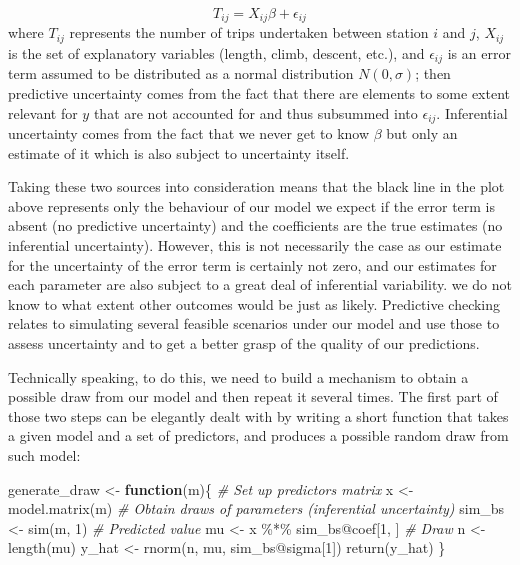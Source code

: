 \documentclass[
]{book}
\newenvironment{Shaded}{\begin{snugshade}}{\end{snugshade}}
\newcommand{\CommentTok}[1]{\textcolor[rgb]{0.56,0.35,0.01}{\textit{#1}}}
\newcommand{\ControlFlowTok}[1]{\textcolor[rgb]{0.13,0.29,0.53}{\textbf{#1}}}
\newcommand{\DecValTok}[1]{\textcolor[rgb]{0.00,0.00,0.81}{#1}}
\newcommand{\FunctionTok}[1]{\textcolor[rgb]{0.00,0.00,0.00}{#1}}
\newcommand{\NormalTok}[1]{#1}
\newcommand{\OtherTok}[1]{\textcolor[rgb]{0.56,0.35,0.01}{#1}}
\newcommand{\SpecialCharTok}[1]{\textcolor[rgb]{0.00,0.00,0.00}{#1}}
\begin{document}
\[
T_{ij} = X_{ij}\beta + \epsilon_{ij}
\]
where \(T_{ij}\) represents the number of trips undertaken between station \(i\) and \(j\), \(X_{ij}\) is the set of explanatory variables (length, climb, descent, etc.), and \(\epsilon_{ij}\) is an error term assumed to be distributed as a normal distribution \(N(0, \sigma)\); then predictive uncertainty comes from the fact that there are elements to some extent relevant for \(y\) that are not accounted for and thus subsummed into \(\epsilon_{ij}\). Inferential uncertainty comes from the fact that we never get to know \(\beta\) but only an estimate of it which is also subject to uncertainty itself.

Taking these two sources into consideration means that the black line in the plot above represents only the behaviour of our model we expect if the error term is absent (no predictive uncertainty) and the coefficients are the true estimates (no inferential uncertainty). However, this is not necessarily the case as our estimate for the uncertainty of the error term is certainly not zero, and our estimates for each parameter are also subject to a great deal of inferential variability. we do not know to what extent other outcomes would be just as likely. Predictive checking relates to simulating several feasible scenarios under our model and use those to assess uncertainty and to get a better grasp of the quality of our predictions.

Technically speaking, to do this, we need to build a mechanism to obtain a possible draw from our model and then repeat it several times. The first part of those two steps can be elegantly dealt with by writing a short function that takes a given model and a set of predictors, and produces a possible random draw from such model:

\begin{Shaded}
\begin{Highlighting}[]
\NormalTok{generate\_draw }\OtherTok{\textless{}{-}} \ControlFlowTok{function}\NormalTok{(m)\{}
  \CommentTok{\# Set up predictors matrix}
\NormalTok{  x }\OtherTok{\textless{}{-}} \FunctionTok{model.matrix}\NormalTok{(m)}
  \CommentTok{\# Obtain draws of parameters (inferential uncertainty)}
\NormalTok{  sim\_bs }\OtherTok{\textless{}{-}} \FunctionTok{sim}\NormalTok{(m, }\DecValTok{1}\NormalTok{)}
  \CommentTok{\# Predicted value}
\NormalTok{  mu }\OtherTok{\textless{}{-}}\NormalTok{ x }\SpecialCharTok{\%*\%}\NormalTok{ sim\_bs}\SpecialCharTok{@}\NormalTok{coef[}\DecValTok{1}\NormalTok{, ]}
  \CommentTok{\# Draw}
\NormalTok{  n }\OtherTok{\textless{}{-}} \FunctionTok{length}\NormalTok{(mu)}
\NormalTok{  y\_hat }\OtherTok{\textless{}{-}} \FunctionTok{rnorm}\NormalTok{(n, mu, sim\_bs}\SpecialCharTok{@}\NormalTok{sigma[}\DecValTok{1}\NormalTok{])}
  \FunctionTok{return}\NormalTok{(y\_hat)}
\NormalTok{\}}
\end{Highlighting}
\end{Shaded}
\end{document}
